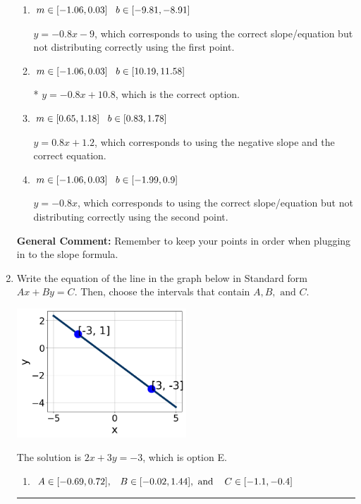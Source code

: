 \documentclass{extbook}[14pt]
\newcommand{\litem}[1]{\item #1

\rule{\textwidth}{0.4pt}}
\begin{document}
\begin{enumerate}
{\begin{enumerate}[label=\Alph*.]
 $y = -0.8x -10.8$, which corresponds to using the correct slope and getting the negative y-intercept.
\item \( m \in [-1.06, 0.03] \hspace*{3mm} b \in [-9.81, -8.91] \)

 $y = -0.8x -9$, which corresponds to using the correct slope/equation but not distributing correctly using the first point.
\item \( m \in [-1.06, 0.03] \hspace*{3mm} b \in [10.19, 11.58] \)

* $y = -0.8x + 10.8$, which is the correct option.
\item \( m \in [0.65, 1.18] \hspace*{3mm} b \in [0.83, 1.78] \)

 $y = 0.8x + 1.2$, which corresponds to using the negative slope and the correct equation.
\item \( m \in [-1.06, 0.03] \hspace*{3mm} b \in [-1.99, 0.9] \)

 $y = -0.8x$, which corresponds to using the correct slope/equation but not distributing correctly using the second point.
\end{enumerate}

\textbf{General Comment:} Remember to keep your points in order when plugging in to the slope formula.
}
\litem{
Write the equation of the line in the graph below in Standard form $Ax+By=C$. Then, choose the intervals that contain $A, B, \text{ and } C$.

\begin{center}
    \includegraphics[width=0.5\textwidth]{../Figures/linearGraphToStandardCopyA.png}
\end{center}


The solution is \( 2x + 3y = -3 \), which is option E.\begin{enumerate}[label=\Alph*.]
\item \( A \in [-0.69, 0.72], \hspace{3mm} B \in [-0.02, 1.44], \text{ and } \hspace{3mm} C \in [-1.1, -0.4] \)


\end{enumerate}}
\end{enumerate}
\end{document}

